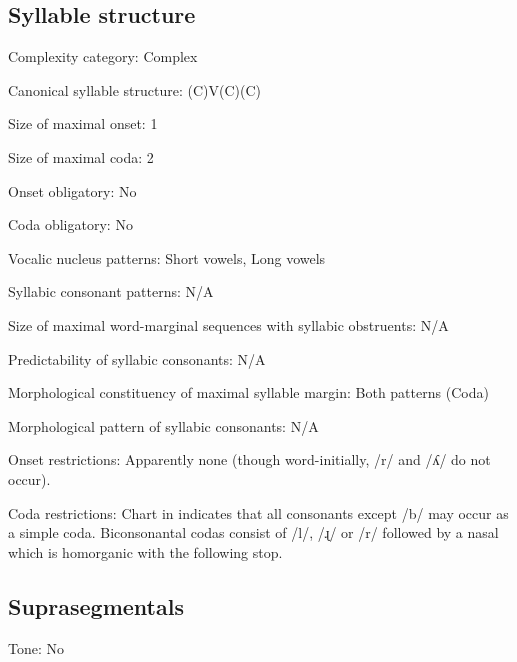 {\subsection*{Syllable structure}
\begin{appendixdesc}

\item[Complexity category:] Complex

\item[Canonical syllable structure:] (C)V(C)(C) \citep[94--104]{Bowern2012}

\item[Size of maximal onset:] 1

\item[Size of maximal coda:] 2

\item[Onset obligatory:] No

\item[Coda obligatory:] No

\item[Vocalic nucleus patterns:] Short vowels, Long vowels

\item[Syllabic consonant patterns:] N/A

\item[Size of maximal word-marginal sequences with syllabic obstruents:] N/A

\item[Predictability of syllabic consonants:] N/A

\item[Morphological constituency of maximal syllable margin:] Both patterns (Coda)

\item[Morphological pattern of syllabic consonants:] N/A

\item[Onset restrictions:] Apparently none (though word-initially, /r/ and /ʎ/ do not occur).

\item[Coda restrictions:] Chart in \citet[102]{Bowern2012} indicates that all consonants except /b/ may occur as a simple coda. Biconsonantal codas consist of /l/, /ɻ/ or /r/ followed by a nasal which is homorganic with the following stop.
\end{appendixdesc}
\subsection*{Suprasegmentals}
\begin{appendixdesc}
\item[Tone:] No


\end{appendixdesc}}
